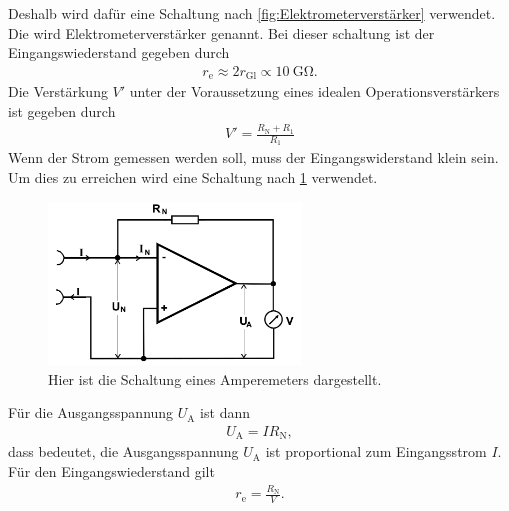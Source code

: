 Deshalb wird dafür eine Schaltung nach \cref{fig:Elektrometerverstärker} verwendet.
Die wird Elektrometerverstärker genannt.
Bei dieser schaltung ist der Eingangswiederstand gegeben durch
\begin{align}
	r_\text{e}\approx 2r_\text{Gl}\propto \SI{10}{\giga\ohm}.
\end{align}
Die Verstärkung $V'$ unter der Voraussetzung eines idealen Operationsverstärkers ist gegeben durch
\begin{align}
	V'=\frac{R_\text{N}+R_1}{R_1 }
\end{align}
Wenn der Strom gemessen werden soll, muss der Eingangswiderstand klein sein.
Um dies zu erreichen wird eine Schaltung nach \cref{fig:Amperemeter} verwendet.
\begin{figure}[h!]
	\centering
	\includegraphics[width = 0.6\textwidth]{../Grafiken/Amperemeter.png}
	\caption{Hier ist die Schaltung eines Amperemeters dargestellt. \cite{V51}\label{fig:Amperemeter}}
\end{figure}
Für die Ausgangsspannung $U_\text{A}$ ist dann
\begin{align}
	U_\text{A}=IR_\text{N},\label{eq:amperemeter_strom}
\end{align}
dass bedeutet, die Ausgangsspannung $U_\text{A}$ ist proportional zum Eingangsstrom $I$.
Für den Eingangswiederstand gilt\\
\begin{align*}
	r_\text{e}=\frac{R_\text{N}}{V}.
\end{align*}
